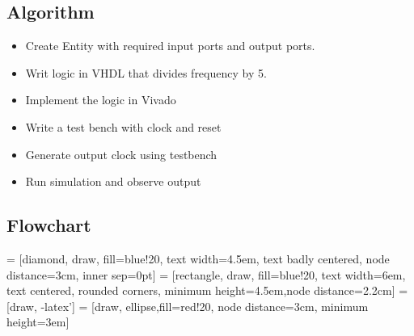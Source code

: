 \documentclass[12pt]{article}
\begin{document}
  \subsection{Algorithm}
  \begin{itemize}
  \item Create Entity with required input ports and output ports.
  \item Writ logic in VHDL that divides frequency by 5.
  \item Implement the logic in Vivado
  \item Write a test bench with clock and reset
  \item Generate output clock using testbench
  \item Run simulation and observe output
  \end{itemize}
   \subsection{Flowchart}
   = [diamond, draw, fill=blue!20, 
    text width=4.5em, text badly centered, node distance=3cm, inner sep=0pt]
 = [rectangle, draw, fill=blue!20, 
    text width=6em, text centered, rounded corners, minimum height=4.5em,node distance=2.2cm]
 = [draw, -latex']
 = [draw, ellipse,fill=red!20, node distance=3cm,
    minimum height=3em]
  \begin{center}    
\end{center}
\end{document}

